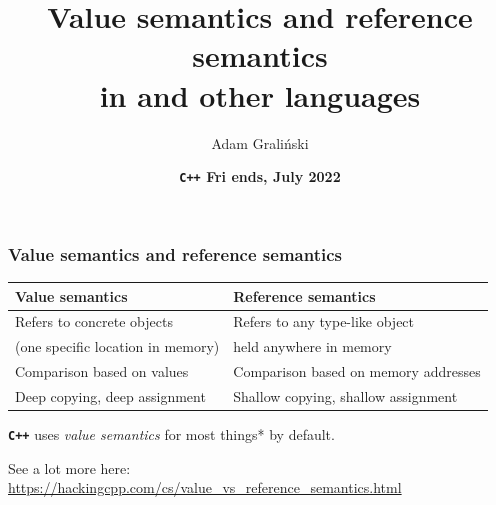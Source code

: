 \documentclass[aspectratio=169]{beamer}
\title[Friends\#21 :: \cpp{ValueAndReferenceSemantics}]{Value semantics and reference semantics\\
in \cpp{C++} and other languages
}
\author{Adam Graliński}
\date[July'22]{\textbf{\texttt{\color[HTML]{d33682}C++} {\color[HTML]{268bd2}F}{\color[HTML]{2aa198}r}{\color[HTML]{859900}i}%
{\color[HTML]{cb4b16}e}{\color[HTML]{dc322f}n}{\color[HTML]{6c71c4}d}{\color[HTML]{b58900}s}, July 2022}}
\newcommand{\greenemph}[1]{\textit{\textcolor{clGreen}{#1}}}
\newcommand{\cpp}[1]{\texttt{\textbf{\textcolor{clCodeBlue}{#1}}}}
\begin{document}
{
\begin{frame}
\titlepage{}
\end{frame}
}

\begin{frame}
\frametitle{Value semantics and reference semantics}
\begin{center}
  \begin{tabular}{m{6cm} | m{7cm}}
    \textbf{Value semantics} & \textbf{Reference semantics}\\
    \hline{}
    Refers to concrete objects          & Refers to any type-like object\\
    (one specific location in memory)   & held anywhere in memory\\
    \hline{}
    Comparison based on values          & Comparison based on memory addresses\\
    \hline{}
    Deep copying, deep assignment       & Shallow copying, shallow assignment\\
  \end{tabular}
\end{center}
\cpp{C++} uses \greenemph{value semantics} for most things* by default.
\vspace*{32pt}\begin{center}
{\small See a lot more here: \url{https://hackingcpp.com/cs/value_vs_reference_semantics.html}}\
\end{center}
\end{frame}
\end{document}
